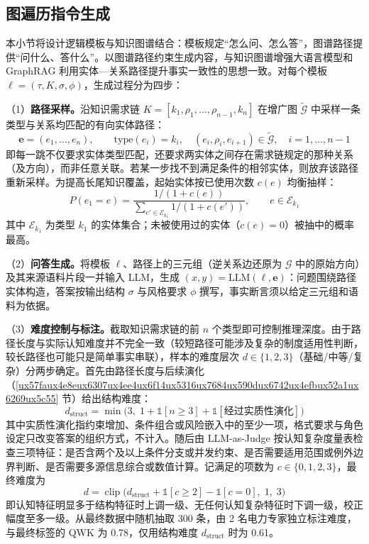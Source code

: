\documentclass[fontset=fandol,type=master,campus=shenzhen,etitleauto=true]{hithesisbook}
\begin{document}
\subsection{图遍历指令生成}\label{ux903bux8f91ux6a21ux677fux9a71ux52a8ux7684ux56feux904dux5386ux751fux6210}

本小节将设计逻辑模板与知识图谱结合：模板规定“怎么问、怎么答”，图谱路径提供“问什么、答什么”。以图谱路径约束生成内容，与知识图谱增强大语言模型和 GraphRAG 利用实体—关系路径提升事实一致性的思想一致\cite{ref15,ref16}。对每个模板 $\ell = (\tau, K, \sigma, \phi)$，生成过程分为四步：

（1）\textbf{路径采样。}沿知识需求链 $K = [k_1, \rho_1, \ldots, \rho_{n-1}, k_n]$ 在增广图 $\tilde{\mathcal{G}}$ 中采样一条类型与关系均匹配的有向实体路径：
\begin{equation}\label{eq:path}
\mathbf{e} = (e_1, \ldots, e_n), \qquad \text{type}(e_i) = k_i, \quad (e_i, \rho_i, e_{i+1}) \in \tilde{\mathcal{G}}, \quad i = 1, \ldots, n-1
\end{equation}
即每一跳不仅要求实体类型匹配，还要求两实体之间存在需求链规定的那种关系（及方向），而非任意关联。若某一步找不到满足条件的相邻实体，则放弃该路径重新采样。为提高长尾知识覆盖，起始实体按已使用次数 $c(e)$ 均衡抽样：
\begin{equation}\label{eq:start-entity}
P(e_1 = e) = \frac{1 / (1 + c(e))}{\sum_{e' \in \mathcal{E}_{k_1}} 1 / (1 + c(e'))}, \qquad e \in \mathcal{E}_{k_1}
\end{equation}
其中 $\mathcal{E}_{k_1}$ 为类型 $k_1$ 的实体集合；未被使用过的实体（$c(e) = 0$）被抽中的概率最高。

（2）\textbf{问答生成。}将模板 $\ell$、路径上的三元组（逆关系边还原为 $\mathcal{G}$ 中的原始方向）及其来源语料片段一并输入 LLM，生成 $(x, y) = \text{LLM}(\ell, \mathbf{e})$：问题围绕路径实体构造，答案按输出结构 $\sigma$ 与风格要求 $\phi$ 撰写，事实断言须以给定三元组和语料为依据。

（3）\textbf{难度控制与标注。}截取知识需求链的前 $n$ 个类型即可控制推理深度。由于路径长度与实际认知难度并不完全一致（较短路径可能涉及复杂的制度适用性判断，较长路径也可能只是简单事实串联），样本的难度层次 $d \in \{1, 2, 3\}$（基础/中等/复杂）分两步确定。首先由路径长度与后续演化（\ref{ux57faux4e8eux6307ux4ee4ux6f14ux5316ux7684ux590dux6742ux4efbux52a1ux6269ux5c55} 节）给出结构难度：
\begin{equation}\label{eq:difficulty}
d_{\text{struct}} = \min\bigl(3,\; 1 + \mathbb{1}[n \ge 3] + \mathbb{1}[\text{经过实质性演化}]\bigr)
\end{equation}
其中实质性演化指约束增加、条件组合或风险嵌入中的至少一项，格式要求与角色设定只改变答案的组织方式，不计入。随后由 LLM-as-Judge 按认知复杂度量表检查三项特征：是否含两个及以上条件分支或并发约束、是否需要适用范围或例外边界判断、是否需要多源信息综合或数值计算。记满足的项数为 $c \in \{0, 1, 2, 3\}$，最终难度为
\begin{equation}\label{eq:difficulty-final}
d = \operatorname{clip}\bigl(d_{\text{struct}} + \mathbb{1}[c \ge 2] - \mathbb{1}[c = 0],\; 1,\; 3\bigr)
\end{equation}
即认知特征明显多于结构特征时上调一级、无任何认知复杂特征时下调一级，校正幅度至多一级。从最终数据中随机抽取 300 条，由 2 名电力专家独立标注难度，与最终标签的 QWK 为 0.78，仅用结构难度 $d_{\text{struct}}$ 时为 0.61。
\end{document}
